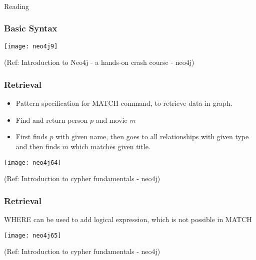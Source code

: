 \begin{frame}[fragile]\frametitle{}
\begin{center}
{\Large Reading}
\end{center}
\end{frame}


\begin{frame}[fragile]\frametitle{Basic Syntax}

\begin{center}
\texttt{[image: neo4j9]}
\end{center}	  


{\tiny (Ref: Introduction to Neo4j - a hands-on crash course  - neo4j)}

\end{frame}

\begin{frame}[fragile]\frametitle{Retrieval}


\begin{itemize}
\item Pattern specification for MATCH command, to retrieve data in graph.
\item Find and return person $p$ and movie $m$
\item First finds $p$ with given name, then goes to all relationships with given type and then finds $m$ which matches given title.
\end{itemize}


\begin{center}
\texttt{[image: neo4j64]}
\end{center}	  


{\tiny (Ref: Introduction to cypher fundamentals  - neo4j)}

\end{frame}

\begin{frame}[fragile]\frametitle{Retrieval}

WHERE can be used to add logical expression, which is not possible in MATCH

\begin{center}
\texttt{[image: neo4j65]}
\end{center}	  


{\tiny (Ref: Introduction to cypher fundamentals  - neo4j)}

\end{frame}




